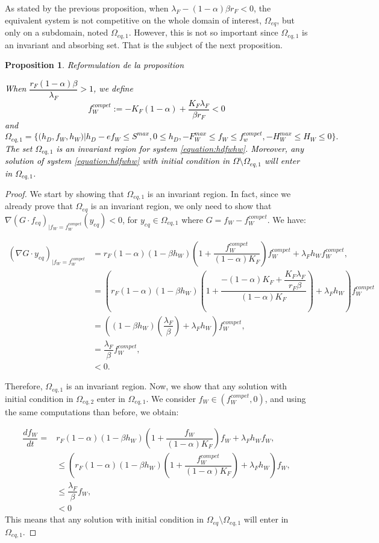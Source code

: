 \documentclass{article}
\newcommand{\lfw}{\lambda_{F}}
\newcommand{\lfw}{\lambda_{F}}
\newcommand{\vdeux}[1]{\textcolor{black}{#1}}
\newtheorem{prop}[theorem]{Proposition}
\theoremstyle{definition}
\theoremstyle{remark}
\begin{document}
As stated by the previous proposition, when $\lfw - (1-\alpha)\beta r_F < 0$, the equivalent system is not competitive on the whole domain of interest, $\Omega_{eq}$, but only on a subdomain, noted $\Omega_{eq, 1}$. However, this is not so important since $\Omega_{eq, 1}$ is an invariant and absorbing set. That is the subject of the next proposition.


\begin{prop} \label{prop:absorbing set}
\vdeux{Reformulation de la proposition}

\vdeux{
When $\dfrac{r_F(1-\alpha) \beta}{\lfw} > 1$, we define 
$$
f_W^{compet} := -K_F(1-\alpha) + \dfrac{K_F \lfw}{\beta r_F} < 0
$$
and
$$
\Omega_{eq, 1} = \Big\{\Big(h_D, f_W, h_W \Big)  \Big|h_D - ef_W \leq S^{max}, 0 \leq h_D,  -F_W^{max} \leq f_W \leq f_w^{compet}, -H_W^{max}\leq  H_W \leq 0 \Big\}.
$$
The set $\Omega_{eq, 1}$ is an invariant region for system \eqref{equation:hdfwhw}. Moreover, any solution of system \eqref{equation:hdfwhw} with initial condition in $\Omega \setminus \Omega_{eq, 1}$ will enter in $\Omega_{eq, 1}$.}
\end{prop}

\begin{proof}
We start by showing that $\Omega_{eq, 1}$ is an invariant region. In fact, since we already prove that $\Omega_{eq}$ is an invariant region, we only need to show that 
$\nabla (G \cdot f_{eq})_{|f_W = f_W^{compet}}(y_{eq}) < 0$, for $y_{eq} \in \Omega_{eq, 1}$ where $G = f_W - f_W^{compet}$. We have:

\begin{align*}
(\nabla G \cdot y_{eq})_{|f_W = f_W^{compet}} &= r_F(1-\alpha)(1-\beta h_W) \left(1 + \dfrac{f_W^{compet}}{(1-\alpha) K_F} \right)f_W^{compet} + \lfw h_W f^{compet}_W, \\
&= \left(r_F(1-\alpha)(1-\beta h_W) \left(1 + \dfrac{-(1-\alpha) K_F + \dfrac{K_F \lfw}{r_F \beta}}{(1-\alpha) K_F}\right) + \lfw h_W \right) f^{compet}_W \\
&= \left((1-\beta h_W) \left( \dfrac{\lfw}{\beta}\right) + \lfw h_W \right) f^{compet}_W, \\
&= \dfrac{\lfw}{\beta} f_W^{compet}, \\
&< 0.
\end{align*}

Therefore, $\Omega_{eq, 1}$ is an invariant region. Now, we show that any solution with initial condition in $\Omega_{eq, 2}$ enter in $\Omega_{eq, 1}$. We consider $f_W \in (f_W^{compet}, 0)$, and using the same computations than before, we obtain:

\begin{align*}
\dfrac{df_W}{dt} = &r_F(1-\alpha)(1-\beta h_W) \left(1 + \dfrac{f_W}{(1-\alpha) K_F}\right)f_W + \lfw h_W  f_W, \\
& \leq \left(r_F(1-\alpha)(1-\beta h_W) \left(1 + \dfrac{f_W^{compet}}{(1-\alpha) K_F}\right) + \lfw h_W  \right) f_W, \\
& \leq \dfrac{\lfw}{\beta} f_W,\\
&< 0
\end{align*}
This means that any solution with initial condition in $\Omega_{eq} \setminus \Omega_{eq, 1}$ will enter in $\Omega_{eq, 1}$.
\end{proof}
\end{document}
